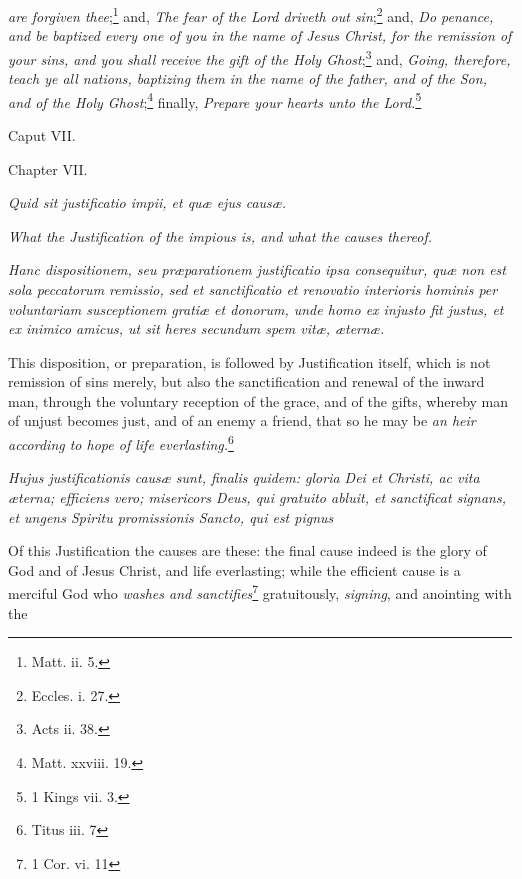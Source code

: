 \emph{are forgiven thee};\footnote{\par   Matt. ii. 5.} and, \emph{The fear of the Lord driveth out sin};\footnote{\par   Eccles. i. 27.} and, \emph{Do penance, and be baptized every one of you in the name of Jesus Christ, for the remission of your sins, and you shall receive the gift of the Holy Ghost};\footnote{\par   Acts ii. 38.} and, \emph{Going, therefore, teach ye all nations, baptizing them in the name of the father, and of the Son, and of the Holy Ghost};\footnote{\par   Matt. xxviii. 19.} finally, \emph{Prepare your hearts unto the Lord.}\footnote{\par   1 Kings vii. 3.}

Caput VII.

Chapter VII.

\emph{Quid sit justificatio impii, et quæ ejus causæ.}

\emph{What the Justification of the impious is, and what the causes thereof.}

\emph{Hanc dispositionem, seu præparationem justificatio ipsa consequitur, quæ non est sola peccatorum remissio, sed et sanctificatio et renovatio interioris hominis per voluntariam susceptionem gratiæ et donorum, unde homo ex injusto fit justus, et ex inimico amicus, ut sit heres secundum spem vitæ, æternæ.}

This disposition, or preparation, is followed by Justification itself, which is not remission of sins merely, but also the sanctification and renewal of the inward man, through the voluntary reception of the grace, and of the gifts, whereby man of unjust becomes just, and of an enemy a friend, that so he may be \emph{an heir according to hope of life everlasting.}\footnote{\par   Titus iii. 7}

\emph{Hujus justificationis causæ sunt, finalis quidem: gloria Dei et Christi, ac vita æterna; efficiens vero; misericors Deus, qui gratuito abluit, et sanctificat signans, et ungens Spiritu promissionis Sancto, qui est pignus }

Of this Justification the causes are these: the final cause indeed is the glory of God and of Jesus Christ, and life everlasting; while the efficient cause is a merciful God who \emph{washes and sanctifies}\footnote{\par   1 Cor. vi. 11} gratuitously, \emph{signing}, and anointing with the

